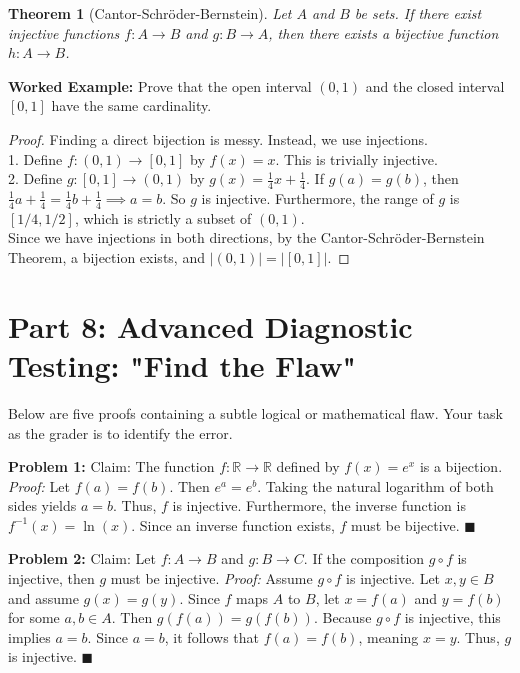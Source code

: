 \documentclass[11pt, a4paper]{article}
\newtheorem{theorem}{Theorem}[section]
\theoremstyle{definition}
\theoremstyle{remark}
\newcommand{\R}{\mathbb{R}}
\begin{document}
\begin{theorem}[Cantor-Schröder-Bernstein]
Let $A$ and $B$ be sets. If there exist injective functions $f: A \to B$ and $g: B \to A$, then there exists a bijective function $h: A \to B$.
\end{theorem}

\textbf{Worked Example:} Prove that the open interval $(0,1)$ and the closed interval $[0,1]$ have the same cardinality.
\begin{proof}
Finding a direct bijection is messy. Instead, we use injections. \\
1. Define $f: (0,1) \to [0,1]$ by $f(x) = x$. This is trivially injective. \\
2. Define $g: [0,1] \to (0,1)$ by $g(x) = \frac{1}{4}x + \frac{1}{4}$. 
If $g(a) = g(b)$, then $\frac{1}{4}a + \frac{1}{4} = \frac{1}{4}b + \frac{1}{4} \implies a = b$. So $g$ is injective. Furthermore, the range of $g$ is $[1/4, 1/2]$, which is strictly a subset of $(0,1)$. \\
Since we have injections in both directions, by the Cantor-Schröder-Bernstein Theorem, a bijection exists, and $|(0,1)| = |[0,1]|$.
\end{proof}

\section{Part 8: Advanced Diagnostic Testing: "Find the Flaw"}

Below are five proofs containing a subtle logical or mathematical flaw. Your task as the grader is to identify the error.

\textbf{Problem 1:} Claim: The function $f: \R \to \R$ defined by $f(x) = e^x$ is a bijection.
\textit{Proof:} Let $f(a) = f(b)$. Then $e^a = e^b$. Taking the natural logarithm of both sides yields $a = b$. Thus, $f$ is injective. Furthermore, the inverse function is $f^{-1}(x) = \ln(x)$. Since an inverse function exists, $f$ must be bijective. $\blacksquare$

\textbf{Problem 2:} Claim: Let $f: A \to B$ and $g: B \to C$. If the composition $g \circ f$ is injective, then $g$ must be injective.
\textit{Proof:} Assume $g \circ f$ is injective. Let $x, y \in B$ and assume $g(x) = g(y)$. Since $f$ maps $A$ to $B$, let $x = f(a)$ and $y = f(b)$ for some $a, b \in A$. Then $g(f(a)) = g(f(b))$. Because $g \circ f$ is injective, this implies $a = b$. Since $a = b$, it follows that $f(a) = f(b)$, meaning $x = y$. Thus, $g$ is injective. $\blacksquare$
\end{document}
